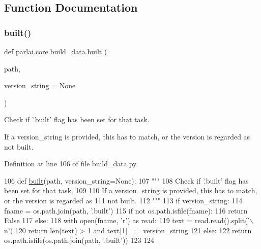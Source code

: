 \subsection{Function Documentation}
\mbox{\label{namespaceparlai_1_1core_1_1build__data_ad834e1a9be02e18a6c2de2b03b9a8f10}} 
\subsubsection{\texorpdfstring{built()}{built()}}
{\footnotesize\ttfamily def parlai.\+core.\+build\+\_\+data.\+built (\begin{DoxyParamCaption}\item[{}]{path,  }\item[{}]{version\+\_\+string = {\ttfamily None} }\end{DoxyParamCaption})}

\begin{DoxyVerb}Check if '.built' flag has been set for that task.

If a version_string is provided, this has to match, or the version is regarded as
not built.
\end{DoxyVerb}
 

Definition at line 106 of file build\+\_\+data.\+py.


\begin{DoxyCode}
106 \textcolor{keyword}{def }\hyperlink{namespaceparlai_1_1core_1_1build__data_ad834e1a9be02e18a6c2de2b03b9a8f10}{built}(path, version\_string=None):
107     \textcolor{stringliteral}{"""}
108 \textcolor{stringliteral}{    Check if '.built' flag has been set for that task.}
109 \textcolor{stringliteral}{}
110 \textcolor{stringliteral}{    If a version\_string is provided, this has to match, or the version is regarded as}
111 \textcolor{stringliteral}{    not built.}
112 \textcolor{stringliteral}{    """}
113     \textcolor{keywordflow}{if} version\_string:
114         fname = os.path.join(path, \textcolor{stringliteral}{'.built'})
115         \textcolor{keywordflow}{if} \textcolor{keywordflow}{not} os.path.isfile(fname):
116             \textcolor{keywordflow}{return} \textcolor{keyword}{False}
117         \textcolor{keywordflow}{else}:
118             with open(fname, \textcolor{stringliteral}{'r') as read:}
119 \textcolor{stringliteral}{                text = read.read().split('\(\backslash\)n'})
120             \textcolor{keywordflow}{return} len(text) > 1 \textcolor{keywordflow}{and} text[1] == version\_string
121     \textcolor{keywordflow}{else}:
122         \textcolor{keywordflow}{return} os.path.isfile(os.path.join(path, \textcolor{stringliteral}{'.built'}))
123 
124 
\end{DoxyCode}
\mbox{\label{namespaceparlai_1_1core_1_1build__data_adc4feba864e2a0d0663cdf6bf84afaf6}} 
